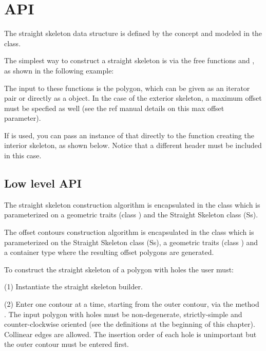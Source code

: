 \section{API}

The straight skeleton data structure is defined by the  concept and modeled in the  class.

The simplest way to construct a straight skeleton is via the free functions  and , as shown in the following example:


The input to these functions is the polygon, which can be given as an iterator pair or directly as a  object. In the case of the exterior skeleton, a maximum offset must be specfied as well (see the ref manual details on this max offset parameter).

If  is used, you can pass an instance of that directly to the function creating the interior skeleton, as shown below. Notice that a different header must be included in this case. 


\subsection{Low level API}

The straight skeleton construction algorithm is encapsulated in the
class  which is
parameterized on a geometric traits (class
) and the Straight
Skeleton class (Ss).

The offset contours construction algorithm is encapsulated in the class
 which is
parameterized on the Straight Skeleton class (Ss), a
geometric traits (class )
and a container type where the resulting offset polygons are
generated.

To construct the straight skeleton of a polygon with holes the user must:
 
(1) Instantiate the straight skeleton builder.

(2) Enter one contour at a time, starting from the outer contour, via
    the method . The input polygon with holes must be 
    non-degenerate, strictly-simple and counter-clockwise oriented
    (see the definitions at the beginning of this chapter).
    Collinear edges are allowed. The insertion order of each hole
    is unimportant but the outer contour must be entered first.

